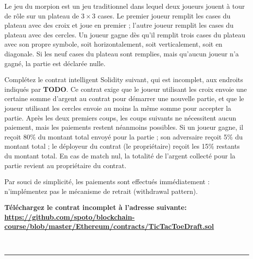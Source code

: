 \documentclass{article}
\begin{document}
Le jeu du morpion est un jeu traditionnel dans lequel deux joueurs jouent à tour de rôle sur un plateau de $3\times 3$ cases. Le premier joueur remplit les cases du plateau avec des croix et joue en premier ; l’autre joueur remplit les cases du plateau avec des cercles.
Un joueur gagne dès qu'il remplit trois cases du plateau avec son propre symbole, soit horizontalement, soit verticalement, soit en diagonale. Si les neuf cases du plateau sont remplies, mais qu'aucun joueur n'a gagné, la partie est déclarée nulle.

Complétez le contrat intelligent Solidity suivant, qui est incomplet, aux endroits indiqués par \textbf{TODO}.
Ce contrat exige que le joueur utilisant les croix envoie une certaine somme d'argent au contrat pour démarrer une nouvelle partie, et que le joueur utilisant les cercles envoie au moins la même somme pour accepter la partie.
Après les deux premiers coups, les coups suivants ne nécessitent aucun paiement, mais les paiements restent néanmoins possibles.
Si un joueur gagne, il reçoit 80\% du montant total envoyé pour la partie ; son adversaire reçoit 5\% du montant total ; le déployeur du contrat (le propriétaire) reçoit les 15\% restants du montant total.
En cas de match nul, la totalité de l'argent collecté pour la partie revient au propriétaire du contrat.

Par souci de simplicité, les paiements sont effectués immédiatement : n'implémentez pas le mécanisme de retrait (withdrawal pattern).

\textbf{Téléchargez le contrat incomplet à l'adresse suivante: \url{https://github.com/spoto/blockchain-course/blob/master/Ethereum/contracts/TicTacToeDraft.sol}}

\mbox{}\\
\hrule
\mbox{}\\
\end{document}
